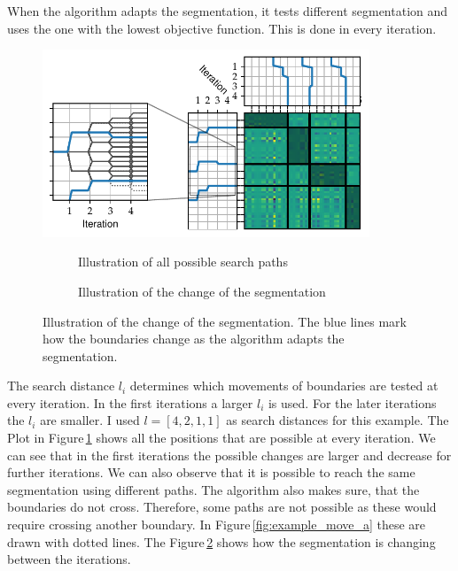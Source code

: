 \documentclass[doctype=mastersthesis,BCOR=15mm,biblatex]{ldvbook}%
\begin{document}
When the algorithm adapts the segmentation, it tests different segmentation and uses the one with the lowest objective function.
This is done in every iteration. 
\begin{figure}[!htb]
	\centering
	\includegraphics[width=0.87\textwidth]{Plots/example_move_iterations.pdf}
	\begin{subfigure}[b]{0.3\textwidth}
		\caption{Illustration of all possible search paths}
		\label{fig:example_move_bound_a}
	\end{subfigure}
	\begin{subfigure}[b]{0.55\textwidth}
		\caption{Illustration of the change of the segmentation}
		\label{fig:example_move_bound_b}
	\end{subfigure}
	\caption{Illustration of the change of the segmentation.
		The blue lines mark how the boundaries change as the algorithm adapts the segmentation.
	}
	\label{fig:example_move_bound}
\end{figure}
The search distance $l_i$ determines which movements of boundaries are tested at every iteration.
In the first iterations a larger $l_i$ is used. 
For the later iterations the $l_i$ are smaller.
I used $l = [4,2,1,1]$ as search distances for this example.
The Plot in Figure\,\ref{fig:example_move_bound_a} shows all the positions that are possible at every iteration.
We can see that in the first iterations the possible changes are larger and decrease for further iterations.
We can also observe that it is possible to reach the same segmentation using different paths.
The algorithm also makes sure, that the boundaries do not cross.
Therefore, some paths are not possible as these would require crossing another boundary. 
In Figure\,\ref{fig:example_move_a} these are drawn with dotted lines.
The Figure\,\ref{fig:example_move_bound_b} shows how the segmentation is changing between the iterations. 

\end{document}
